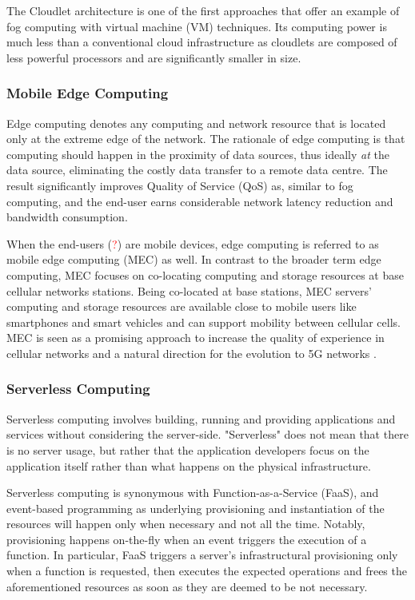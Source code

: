 The Cloudlet \cite{cloudlet} architecture is one of the first approaches that offer an example of fog computing with virtual machine (VM) techniques. Its computing power is much less than a conventional cloud infrastructure as cloudlets are composed of less powerful processors and are significantly smaller in size.

\subsubsection{Mobile Edge Computing}

Edge computing \cite{edge-computing-vision-challenges} denotes any computing and network resource that is located only at the extreme edge of the network. The rationale of edge computing is that computing should happen in the proximity of data sources, thus ideally \emph{at} the data source, eliminating the costly data transfer to a remote data centre. The result significantly improves Quality of Service (QoS) as, similar to fog computing, and the end-user earns considerable network latency reduction and bandwidth consumption.

When the end-users (\textcolor{red}{?}) are mobile devices, edge computing is referred to as mobile edge computing (MEC) \cite{mec} as well. In contrast to the broader term edge computing, MEC focuses on co-locating computing and storage resources at base cellular networks stations. Being co-located at base stations, MEC servers' computing and storage resources are available close to mobile users like smartphones and smart vehicles and can support mobility between cellular cells. MEC is seen as a promising approach to increase the quality of experience in cellular networks and a natural direction for the evolution to 5G networks \cite{nfv-5g}.

\subsubsection{Serverless Computing}

Serverless computing \cite{serverless-berkeley} involves building, running and providing applications and services without considering the server-side. "Serverless" does not mean that there is no server usage, but rather that the application developers focus on the application itself rather than what happens on the physical infrastructure.

Serverless computing is synonymous with Function-as-a-Service (FaaS), and event-based programming as underlying provisioning and instantiation of the resources will happen only when necessary and not all the time. Notably, provisioning happens on-the-fly when an event triggers the execution of a function. In particular, FaaS triggers a server's infrastructural provisioning only when a function is requested, then executes the expected operations and frees the aforementioned resources as soon as they are deemed to be not necessary.

